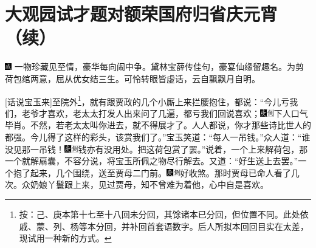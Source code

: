 

\chapter{大观园试才题对额\hspace{.5em}荣国府归省庆元宵（续）}
{\includegraphics[width=3mm]{../Images/00005}  \kaishu 一物珍藏见至情，豪华每向闹中争。黛林宝薛传佳句，豪宴仙缘留趣名。为剪荷包绾两意，屈从优女结三生。可怜转眼皆虚话，云自飘飘月自明。}

{[}话说宝玉来{]}至院外\footnote{按：己、庚本第十七至十八回未分回，其馀诸本已分回，但位置不同。此处依戚、蒙、列、杨等本分回，并补回首套语数字。后人所拟本回回目实在太差，现试用一种新的方式。}，就有跟贾政的几个小厮上来拦腰抱住，都说：“今儿亏我们，老爷才喜欢，老太太打发人出来问了几遍，都亏我们回说喜欢；{\includegraphics[width=3mm]{../Images/00004}\includegraphics[width=3mm]{../Images/00011}\footnotesize \kaishu 下人口气毕肖。}不然，若老太太叫你进去，就不得展才了。人人都说，你才那些诗比世人的都强。今儿得了这样的彩头，该赏我们了。”宝玉笑道：“每人一吊钱。”众人道：“谁没见那一吊钱！{\includegraphics[width=3mm]{../Images/00004}\includegraphics[width=3mm]{../Images/00011}\footnotesize \kaishu 钱亦有没用处。}把这荷包赏了罢。”说着，一个上来解荷包，那一个就解扇囊，不容分说，将宝玉所佩之物尽行解去。又道：“好生送上去罢。”一个抱了起来，几个围绕，送至贾母二门前。{\includegraphics[width=3mm]{../Images/00004}\includegraphics[width=3mm]{../Images/00011}\footnotesize \kaishu 好收煞。}那时贾母已命人看了几次。众奶娘丫鬟跟上来，见过贾母，知不曾难为着他，心中自是喜欢。

